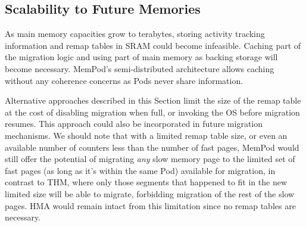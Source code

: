 \subsection{Scalability to Future Memories}


As main memory capacities grow to terabytes, storing activity tracking information and remap tables in SRAM could become infeasible. Caching part of the migration logic and using part of main memory as backing storage will become necessary. MemPod's semi-distributed architecture allows caching without any coherence concerns as Pods never share information. %




Alternative approaches described in this Section limit the size of the remap table at the cost of disabling migration when full, or invoking the OS before migration resumes. This approach could also be incorporated in future migration mechanisms. We should note that with a limited remap table size, or even an available number of counters less than the number of fast pages, MemPod would still offer the potential of migrating \textit{any} slow memory page to the limited set of fast pages (as long as it's within the same Pod) available for migration, in contrast to THM, where only those segments that happened to fit in the new limited size will be able to migrate, forbidding migration of the rest of the slow pages. HMA would remain intact from this limitation since no remap tables are necessary.

